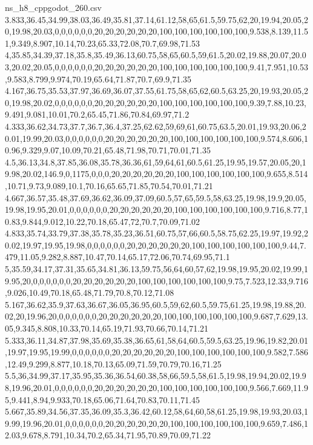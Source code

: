 \begin{filecontents*}[overwrite]{ns_h8_cppgodot_260.csv}
3.833,36.45,34.99,38.03,36.49,35.81,37.14,61.12,58,65,61.5,59.75,62,20,19.94,20.05,20,19.98,20.03,0,0,0,0,0,0,20,20,20,20,20,20,100,100,100,100,100,100,9.538,8.139,11.51,9.349,8.907,10.14,70.23,65.33,72.08,70.7,69.98,71.53
4,35.85,34.39,37.18,35.8,35.49,36.13,60.75,58,65,60.5,59,61.5,20.02,19.88,20.07,20.03,20.02,20.05,0,0,0,0,0,0,20,20,20,20,20,20,100,100,100,100,100,100,9.41,7.951,10.53,9.583,8.799,9.974,70.19,65.64,71.87,70.7,69.9,71.35
4.167,36.75,35.53,37.97,36.69,36.07,37.55,61.75,58,65,62,60.5,63.25,20,19.93,20.05,20,19.98,20.02,0,0,0,0,0,0,20,20,20,20,20,20,100,100,100,100,100,100,9.39,7.88,10.23,9.491,9.081,10.01,70.2,65.45,71.86,70.84,69.97,71.2
4.333,36.62,34.73,37.7,36.7,36.4,37.25,62.62,59,69,61,60.75,63.5,20.01,19.93,20.06,20.01,19.99,20.03,0,0,0,0,0,0,20,20,20,20,20,20,100,100,100,100,100,100,9.574,8.606,10.96,9.329,9.07,10.09,70.21,65.48,71.98,70.71,70.01,71.35
4.5,36.13,34.8,37.85,36.08,35.78,36.36,61,59,64,61,60.5,61.25,19.95,19.57,20.05,20,19.98,20.02,146.9,0,1175,0,0,0,20,20,20,20,20,20,100,100,100,100,100,100,9.655,8.514,10.71,9.73,9.089,10.1,70.16,65.65,71.85,70.54,70.01,71.21
4.667,36.57,35.48,37.69,36.62,36.09,37.09,60.5,57,65,59.5,58,63.25,19.98,19.9,20.05,19.98,19.95,20.01,0,0,0,0,0,0,20,20,20,20,20,20,100,100,100,100,100,100,9.716,8.77,10.83,9.844,9.012,10.22,70.18,65.47,72,70.7,70.09,71.02
4.833,35.74,33.79,37.38,35.78,35.23,36.51,60.75,57,66,60.5,58.75,62.25,19.97,19.92,20.02,19.97,19.95,19.98,0,0,0,0,0,0,20,20,20,20,20,20,100,100,100,100,100,100,9.44,7.479,11.05,9.282,8.887,10.47,70.14,65.17,72.06,70.74,69.95,71.1
5,35.59,34.17,37.31,35.65,34.81,36.13,59.75,56,64,60,57,62,19.98,19.95,20.02,19.99,19.95,20,0,0,0,0,0,0,20,20,20,20,20,20,100,100,100,100,100,100,9.75,7.523,12.33,9.716,9.026,10.49,70.18,65.48,71.79,70.8,70.12,71.08
5.167,36.62,35.9,37.63,36.67,36.05,36.95,60.5,59,62,60.5,59.75,61.25,19.98,19.88,20.02,20,19.96,20,0,0,0,0,0,0,20,20,20,20,20,20,100,100,100,100,100,100,9.687,7.629,13.05,9.345,8.808,10.33,70.14,65.19,71.93,70.66,70.14,71.21
5.333,36.11,34.87,37.98,35.69,35.38,36.65,61,58,64,60.5,59.5,63.25,19.96,19.82,20.01,19.97,19.95,19.99,0,0,0,0,0,0,20,20,20,20,20,20,100,100,100,100,100,100,9.582,7.586,12.49,9.299,8.877,10.18,70.13,65.09,71.59,70.79,70.16,71.25
5.5,36,34.99,37.17,35.95,35.36,36.54,60.38,58,66,59.5,58,61.5,19.98,19.94,20.02,19.98,19.96,20.01,0,0,0,0,0,0,20,20,20,20,20,20,100,100,100,100,100,100,9.566,7.669,11.95,9.441,8.94,9.933,70.18,65.06,71.64,70.83,70.11,71.45
5.667,35.89,34.56,37.35,36.09,35.3,36.42,60.12,58,64,60,58,61.25,19.98,19.93,20.03,19.99,19.96,20.01,0,0,0,0,0,0,20,20,20,20,20,20,100,100,100,100,100,100,9.659,7.486,12.03,9.678,8.791,10.34,70.2,65.34,71.95,70.89,70.09,71.22

\end{filecontents*}
